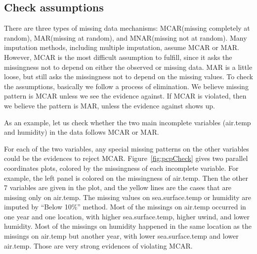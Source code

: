 \documentclass[article]{jss}
\begin{document}
\subsection{Check assumptions}

There are three types of missing data mechanisms: MCAR(missing completely at random), MAR(missing at random), and MNAR(missing not at random). Many imputation methods, including multiple imputation, assume MCAR or MAR. However, MCAR is the most difficult assumption to fulfill, since it asks the missingness not to depend on either the observed or missing data. MAR is a little loose, but still asks the missingness not to depend on the missing values. To check the assumptions, basically we follow a process of elimination. We believe missing pattern is MCAR unless we see the evidence against. If MCAR is violated, then we believe the pattern is MAR, unless the evidence against shows up.

As an example, let us check whether the two main incomplete variables (air.temp and humidity) in the data  follows MCAR or MAR.

For each of the two variables, any special missing patterns on the other variables could be the evidences to reject MCAR. Figure~\ref{fig:pcpCheck} gives two parallel coordinates plots, colored by the missingness of each incomplete variable. For example, the left panel is colored on the missingness of air.temp. Then the other 7 variables are given in the plot, and the yellow lines are the cases that are missing only on air.temp. The missing values on sea.surface.temp or humidity are imputed by ``Below 10\%'' method. Most of the missings on air.temp occurred in one year and one location, with higher sea.surface.temp, higher uwind, and lower humidity. Most of the missings on humidity happened in the same location as the missings on air.temp but another year, with lower sea.surface.temp and lower air.temp. Those are very strong evidences of violating MCAR.
\end{document}
